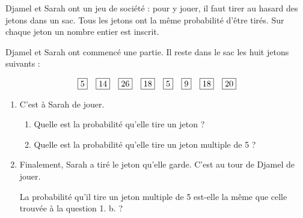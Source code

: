 
\medskip

Djamel et Sarah ont un jeu de société : pour y jouer, il faut tirer au hasard des jetons dans un sac. Tous les jetons ont la même probabilité d'être tirés. Sur chaque jeton un nombre entier est inscrit.

\smallskip

Djamel et Sarah ont commencé une partie. Il reste dans le sac les huit jetons suivants :

\[\fbox{5}\quad \fbox{14}\quad\fbox{26}\quad\fbox{18}\quad\fbox{5}\quad\fbox{9}\quad\fbox{18}\quad\fbox{20}\]

\begin{enumerate}
\item C'est à Sarah de jouer.
	\begin{enumerate}
		\item Quelle est la probabilité qu'elle tire un jeton  \fg{}?
		\item Quelle est la probabilité qu'elle tire un jeton multiple de 5 ?
	\end{enumerate}
\item  Finalement, Sarah a tiré le jeton  \fg{} qu'elle garde. C'est au tour de Djamel de jouer.
	
La probabilité qu'il tire un jeton multiple de 5 est-elle la même que celle trouvée à la question 1. b. ?

\end{enumerate}

\vspace{0,5cm}

